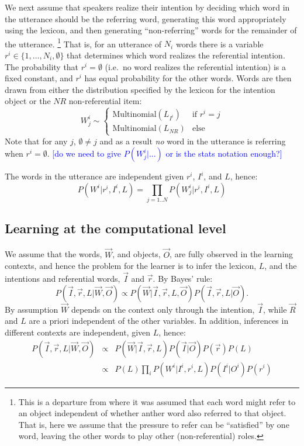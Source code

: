\documentclass[man,noapacite,12pt]{apa2}
\newcommand{\nnote}[1]{\textcolor{blue}{[#1]}}
\begin{document}
We next assume that speakers realize their intention by deciding which word in the utterance should be the referring word, generating this word appropriately using the lexicon, and then generating ``non-referring'' words for the remainder of the utterance. \footnote{This is a departure from \cite{frank2009} where it was assumed that each word might refer to an object independent of whether anther word also referred to that object. That is, here we assume that the pressure to refer can be ``satisfied'' by one word, leaving the other words to play other (non-referential) roles.}
That is, for an utterance of $N_{i}$ words there is a variable $r^{i} \in \{1,\dots,N_{i}, \emptyset \}$ that determines which word realizes the referential intention. The probability that $r^{i}=\emptyset$ (i.e.~no word realizes the referential intention) is a fixed constant, and $r^{i}$ has equal probability for the other words.
Words are then drawn from either the distribution specified by the lexicon for the intention object or the $NR$ non-referential item:
\begin{equation}
W^{i}_{j} \sim 
\begin{cases}
\text{Multinomial}(L_{I^{i}}) & \text{if } r^{i}=j \\
\text{Multinomial}(L_{NR}) & \text{else}
\end{cases}
\end{equation}
Note that for any $j$, $\emptyset \neq j$ and as a result \emph{no} word in the utterance is referring when $r^{i}=\emptyset$.
\nnote{do we need to give $P(W^{i}_{j}|...)$ or is the stats notation enough?}

The words in the utterance are independent given $r^{i}$, $I^{i}$, and $L$, hence:
\begin{equation}
P(W^{i}|r^{i}, I^{i}, L) = \prod_{j=1..N}P(W^{i}_{j}|r^{i}, I^{i}, L)
\end{equation}


\subsection{Learning at the computational level}

We assume that the words, $\vec{W}$, and objects, $\vec{O}$, are fully observed in the learning contexts, and hence the problem for the learner is to infer the lexicon, $L$, and the intentions and referential words, $\vec{I}$ and $\vec{r}$. By Bayes' rule:
$$
P( \vec{I}, \vec{r}, L | \vec{W}, \vec{O}) \propto P(\vec{W}| \vec{I}, \vec{r}, L, \vec{O} )  P(\vec{I},\vec{r},L | \vec{O}).
$$
By assumption $\vec{W}$ depends on the context only through the intention, $\vec{I}$, while $\vec{R}$ and $L$ are a priori independent of the other variables. In addition, inferences in different contexts are independent, given $L$, hence:
\begin{eqnarray}
P( \vec{I}, \vec{r}, L | \vec{W}, \vec{O}) &\propto& P(\vec{W}| \vec{I}, \vec{r}, L ) P(\vec{I} | \vec{O}) P(\vec{r})P(L) \\
&\propto& P(L) \prod_{i} P(W^{i}| I^{i}, r^{i}, L ) P(I^{i} | O^{i}) P(r^{i})
\end{eqnarray}
\end{document}
